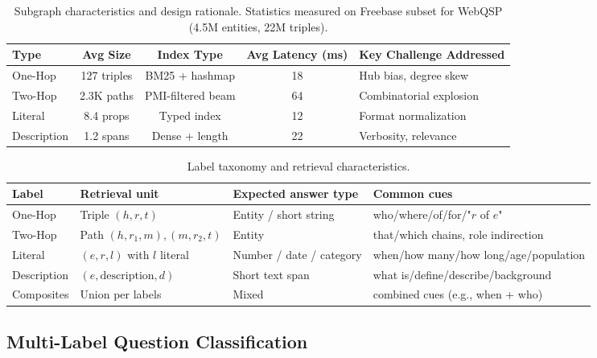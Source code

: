 \documentclass[conference]{IEEEtran}
\begin{document}
\begin{table}[t]
\centering
\caption{Subgraph characteristics and design rationale. Statistics measured on Freebase subset for WebQSP (4.5M entities, 22M triples).}
\label{tab:subgraph_stats}
\begin{adjustbox}{max width=\columnwidth}
\begin{tabular}{lcccl}
\toprule
Type & Avg Size & Index Type & Avg Latency (ms) & Key Challenge Addressed \\
\midrule
One-Hop & 127 triples & BM25 + hashmap & 18 & Hub bias, degree skew \\
Two-Hop & 2.3K paths & PMI-filtered beam & 64 & Combinatorial explosion \\
Literal & 8.4 props & Typed index & 12 & Format normalization \\
Description & 1.2 spans & Dense + length & 22 & Verbosity, relevance \\
\bottomrule
\end{tabular}
\end{adjustbox}
\end{table}

\begin{table}[t]
\centering
\caption{Label taxonomy and retrieval characteristics.}
\label{tab:label_taxonomy}
\begin{adjustbox}{max width=\columnwidth}
\begin{tabular}{l l l l}
\toprule
Label & Retrieval unit & Expected answer type & Common cues \\
\midrule
One-Hop & Triple $(h,r,t)$ & Entity / short string & who/where/of/for/"$r$ of $e$" \\
Two-Hop & Path $(h,r_1,m),(m,r_2,t)$ & Entity & that/which chains, role indirection \\
Literal & $(e,r,l)$ with $l$ literal & Number / date / category & when/how many/how long/age/population \\
Description & $(e,\text{description},d)$ & Short text span & what is/define/describe/background \\
Composites & Union per labels & Mixed & combined cues (e.g., when + who) \\
\bottomrule
\end{tabular}
\end{adjustbox}
\end{table}

\subsection{Multi-Label Question Classification}
\label{sec:classification}
\end{document}
